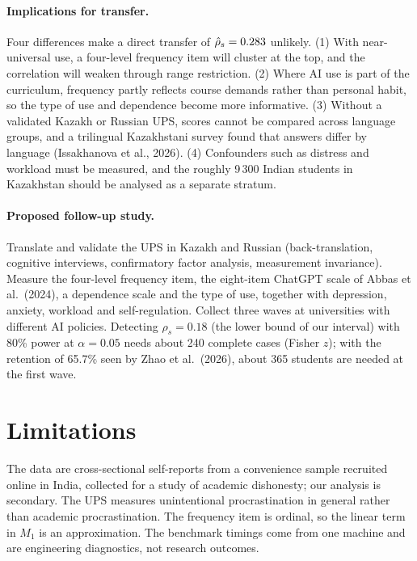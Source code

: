 \documentclass[11pt,a4paper]{article}
\begin{document}
\paragraph{Implications for transfer.} Four differences make a direct transfer of $\hat\rho_s=0.283$ unlikely. (1) With near-universal use, a four-level frequency item will cluster at the top, and the correlation will weaken through range restriction. (2) Where AI use is part of the curriculum, frequency partly reflects course demands rather than personal habit, so the type of use and dependence become more informative. (3) Without a validated Kazakh or Russian UPS, scores cannot be compared across language groups, and a trilingual Kazakhstani survey found that answers differ by language (Issakhanova et al., 2026). (4) Confounders such as distress and workload must be measured, and the roughly 9\,300 Indian students in Kazakhstan should be analysed as a separate stratum.

\paragraph{Proposed follow-up study.} Translate and validate the UPS in Kazakh and Russian (back-translation, cognitive interviews, confirmatory factor analysis, measurement invariance). Measure the four-level frequency item, the eight-item ChatGPT scale of Abbas et al.\ (2024), a dependence scale and the type of use, together with depression, anxiety, workload and self-regulation. Collect three waves at universities with different AI policies. Detecting $\rho_s=0.18$ (the lower bound of our interval) with 80\% power at $\alpha=0.05$ needs about 240 complete cases (Fisher $z$); with the retention of 65.7\% seen by Zhao et al.\ (2026), about 365 students are needed at the first wave.

\section{Limitations}
The data are cross-sectional self-reports from a convenience sample recruited online in India, collected for a study of academic dishonesty; our analysis is secondary. The UPS measures unintentional procrastination in general rather than academic procrastination. The frequency item is ordinal, so the linear term in $M_1$ is an approximation. The benchmark timings come from one machine and are engineering diagnostics, not research outcomes.
\end{document}

